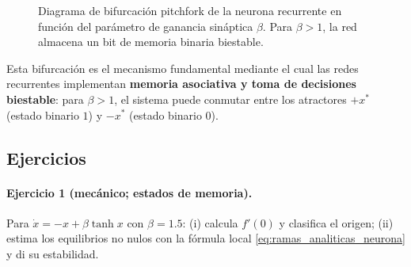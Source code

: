 \begin{figure}[htbp]
\centering
{}
\caption{Diagrama de bifurcación pitchfork de la neurona recurrente en función del parámetro de ganancia sináptica $\beta$. Para $\beta > 1$, la red almacena un bit de memoria binaria biestable.}
\label{fig:bifurcacion_red_neuronal}
\end{figure}

Esta bifurcación es el mecanismo fundamental mediante el cual las redes recurrentes implementan \textbf{memoria asociativa y toma de decisiones biestable}: para $\beta > 1$, el sistema puede conmutar entre los atractores $+x^*$ (estado binario $1$) y $-x^*$ (estado binario $0$).

\subsection{Ejercicios}

\paragraph{Ejercicio 1 (mecánico; estados de memoria).} Para $\dot{x}=-x+\beta\tanh x$ con $\beta=1.5$: (i) calcula $f'(0)$ y clasifica el origen; (ii) estima los equilibrios no nulos con la fórmula local \eqref{eq:ramas_analiticas_neurona} y di su estabilidad.

